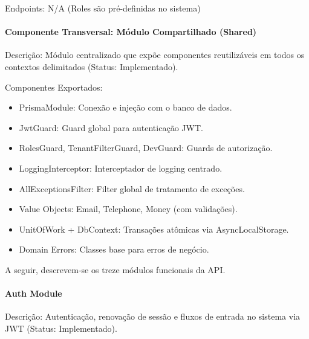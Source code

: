 Endpoints: N/A (Roles são pré-definidas no sistema)

\paragraph{Componente Transversal: Módulo Compartilhado (Shared)}

Descrição: Módulo centralizado que expõe componentes reutilizáveis em todos os contextos delimitados (Status: Implementado).

Componentes Exportados:
\begin{itemize}
\item PrismaModule: Conexão e injeção com o banco de dados.
\item JwtGuard: Guard global para autenticação JWT.
\item RolesGuard, TenantFilterGuard, DevGuard: Guards de autorização.
\item LoggingInterceptor: Interceptador de logging centrado.
\item AllExceptionsFilter: Filter global de tratamento de exceções.
\item Value Objects: Email, Telephone, Money (com validações).
\item UnitOfWork + DbContext: Transações atômicas via AsyncLocalStorage.
\item Domain Errors: Classes base para erros de negócio.
\end{itemize}

A seguir, descrevem-se os treze módulos funcionais da API.

\paragraph{Auth Module}

Descrição: Autenticação, renovação de sessão e fluxos de entrada no sistema via JWT (Status: Implementado).

